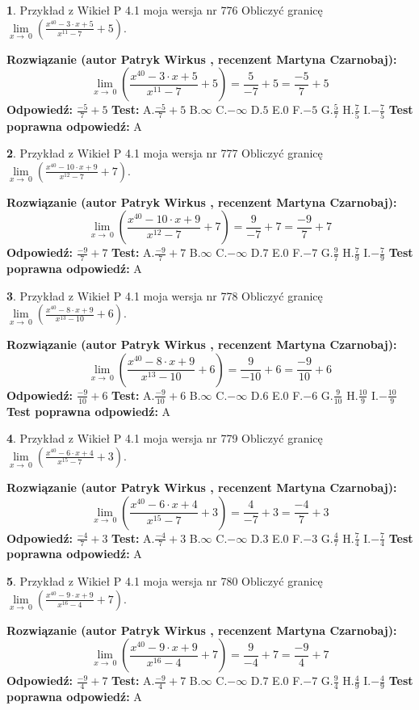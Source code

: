 \documentclass[12pt, a4paper]{article}
\theoremstyle{definition} %
\newtheorem{zad}{}
\newcommand{\zadStart}[1]{\begin{zad}#1\newline}
\newcommand{\zadStop}{\end{zad}}
\newcommand{\rozwStart}[2]{\noindent \textbf{Rozwiązanie (autor #1 , recenzent #2): }\newline}
\newcommand{\rozwStop}{\newline}
\newcommand{\odpStart}{\noindent \textbf{Odpowiedź:}\newline}
\newcommand{\odpStop}{\newline}
\newcommand{\testStart}{\noindent \textbf{Test:}\newline}
\newcommand{\testStop}{\newline}
\newcommand{\kluczStart}{\noindent \textbf{Test poprawna odpowiedź:}\newline}
\newcommand{\kluczStop}{\newline}
\begin{document}
\zadStart{Przykład z Wikieł P 4.1 moja wersja nr 776}
Obliczyć granicę $\lim\limits_{x\to\ 0}(\frac{x^{40}-3 \cdot x +5}{x^{11}-7}+5)$.
\zadStop
\rozwStart{Patryk Wirkus}{Martyna Czarnobaj}
$$\lim\limits_{x\to\ 0}(\frac{x^{40}-3 \cdot x +5}{x^{11}-7}+5)=\frac{5}{-7}+5=\frac{-5}{7}+5$$
\rozwStop
\odpStart
$\frac{-5}{7}+5$
\odpStop
\testStart
A.$\frac{-5}{7}+5$
B.$\infty$
C.$-\infty$
D.$5$
E.$0$
F.$-5$
G.$\frac{5}{7}$
H.$\frac{7}{5}$
I.$-\frac{7}{5}$
\testStop
\kluczStart
A
\kluczStop



\zadStart{Przykład z Wikieł P 4.1 moja wersja nr 777}
Obliczyć granicę $\lim\limits_{x\to\ 0}(\frac{x^{40}-10 \cdot x +9}{x^{12}-7}+7)$.
\zadStop
\rozwStart{Patryk Wirkus}{Martyna Czarnobaj}
$$\lim\limits_{x\to\ 0}(\frac{x^{40}-10 \cdot x +9}{x^{12}-7}+7)=\frac{9}{-7}+7=\frac{-9}{7}+7$$
\rozwStop
\odpStart
$\frac{-9}{7}+7$
\odpStop
\testStart
A.$\frac{-9}{7}+7$
B.$\infty$
C.$-\infty$
D.$7$
E.$0$
F.$-7$
G.$\frac{9}{7}$
H.$\frac{7}{9}$
I.$-\frac{7}{9}$
\testStop
\kluczStart
A
\kluczStop



\zadStart{Przykład z Wikieł P 4.1 moja wersja nr 778}
Obliczyć granicę $\lim\limits_{x\to\ 0}(\frac{x^{40}-8 \cdot x +9}{x^{13}-10}+6)$.
\zadStop
\rozwStart{Patryk Wirkus}{Martyna Czarnobaj}
$$\lim\limits_{x\to\ 0}(\frac{x^{40}-8 \cdot x +9}{x^{13}-10}+6)=\frac{9}{-10}+6=\frac{-9}{10}+6$$
\rozwStop
\odpStart
$\frac{-9}{10}+6$
\odpStop
\testStart
A.$\frac{-9}{10}+6$
B.$\infty$
C.$-\infty$
D.$6$
E.$0$
F.$-6$
G.$\frac{9}{10}$
H.$\frac{10}{9}$
I.$-\frac{10}{9}$
\testStop
\kluczStart
A
\kluczStop



\zadStart{Przykład z Wikieł P 4.1 moja wersja nr 779}
Obliczyć granicę $\lim\limits_{x\to\ 0}(\frac{x^{40}-6 \cdot x +4}{x^{15}-7}+3)$.
\zadStop
\rozwStart{Patryk Wirkus}{Martyna Czarnobaj}
$$\lim\limits_{x\to\ 0}(\frac{x^{40}-6 \cdot x +4}{x^{15}-7}+3)=\frac{4}{-7}+3=\frac{-4}{7}+3$$
\rozwStop
\odpStart
$\frac{-4}{7}+3$
\odpStop
\testStart
A.$\frac{-4}{7}+3$
B.$\infty$
C.$-\infty$
D.$3$
E.$0$
F.$-3$
G.$\frac{4}{7}$
H.$\frac{7}{4}$
I.$-\frac{7}{4}$
\testStop
\kluczStart
A
\kluczStop



\zadStart{Przykład z Wikieł P 4.1 moja wersja nr 780}
Obliczyć granicę $\lim\limits_{x\to\ 0}(\frac{x^{40}-9 \cdot x +9}{x^{16}-4}+7)$.
\zadStop
\rozwStart{Patryk Wirkus}{Martyna Czarnobaj}
$$\lim\limits_{x\to\ 0}(\frac{x^{40}-9 \cdot x +9}{x^{16}-4}+7)=\frac{9}{-4}+7=\frac{-9}{4}+7$$
\rozwStop
\odpStart
$\frac{-9}{4}+7$
\odpStop
\testStart
A.$\frac{-9}{4}+7$
B.$\infty$
C.$-\infty$
D.$7$
E.$0$
F.$-7$
G.$\frac{9}{4}$
H.$\frac{4}{9}$
I.$-\frac{4}{9}$
\testStop
\kluczStart
A
\kluczStop
\end{document}
